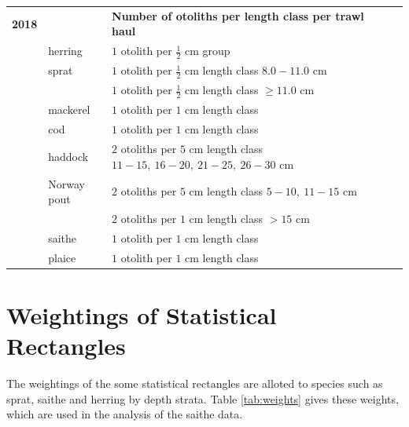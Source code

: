 \documentclass[a4paper 12pt]{article}
\numberwithin{equation}{section}
\begin{document}
{\begin{small}
\begin{table}[h!]
\begin{tabularx}{\linewidth}{r l l l l X}
{\bf 2018} & & {\bf Number of otoliths per length class per trawl haul}  \\[1.0ex]
  & herring  &  $1$  otolith per $\frac{1}{2}$ cm group \\[0.5ex]
     & sprat    & $1$  otolith per $\frac{1}{2}$ cm length class  $8.0 -11.0$ cm\\[0.5ex]
              & & $1$  otolith per $\frac{1}{2}$ cm length class  $\geq 11.0$ cm\\[0.5ex]
& mackerel      & $1$  otolith per $1$ cm length class \\[0.5ex]
& cod       	  & $1$  otolith per $1$ cm length class\\[0.5ex]
& haddock & $2$  otoliths per $5$ cm length class $11 -15, \ 16-20, \ 21-25, \ 26-30$ cm \\[0.5ex]
& Norway pout & $2$  otoliths per $5$ cm length class $5 -10, \ 11-15$ cm\\[0.5ex]
               & & $2$  otoliths per $1$ cm length class $> 15$ cm\\[1.0ex]
&saithe        & $1$  otolith per $1$ cm length class \\[0.5ex]  
&plaice       & $1$  otolith per $1$ cm length class \\[0.1ex]
\bottomrule         
\end{tabularx}
\end{table}
\end{small}

 \section{\large Weightings of Statistical Rectangles}
 \label{secAp:weightings}
 
 The weightings of the some statistical rectangles are alloted to species such as sprat, saithe and herring by depth strata. Table \ref{tab:weights} gives these weights, which are used in the analysis of the saithe data.\\
 
}
\end{document}
